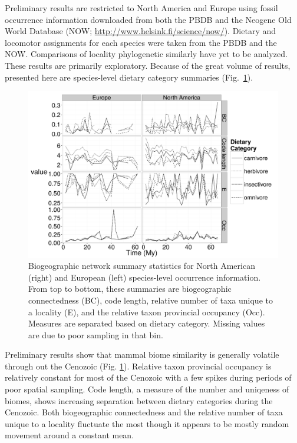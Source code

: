 \documentclass[11pt,letterpaper]{article}
\begin{document}
Preliminary results are restricted to North America and Europe using fossil occurrence information downloaded from both the PBDB and the Neogene Old World Database (NOW; \url{http://www.helsink.fi/science/now/}). Dietary and locomotor assignments for each species were taken from the PBDB and the NOW. Comparisons of locality phylogenetic similarly have yet to be analyzed. These results are primarily exploratory. Because of the great volume of results, presented here are species-level dietary category summaries (Fig.~\ref{fig:com}).

\begin{figure}[ht]
  \centering
  \includegraphics[width = \textwidth, height = 0.4\textheight, keepaspectratio = true]{figure/diets}
  \caption{Biogeographic network summary statistics for North American (right) and European (left) species-level occurrence information. From top to bottom, these summaries are biogeographic connectedness (BC), code length, relative number of taxa unique to a locality (E), and the relative taxon provincial occupancy (Occ). Measures are separated based on dietary category. Missing values are due to poor sampling in that bin.}
  \label{fig:com}
\end{figure}

Preliminary results show that mammal biome similarity is generally volatile through out the Cenozoic (Fig. \ref{fig:com}). Relative taxon provincial occupancy is relatively constant for most of the Cenozoic with a few spikes during periods of poor spatial sampling. Code length, a measure of the number and uniqeness of biomes, shows increasing separation between dietary categories during the Cenozoic. Both biogeographic connectedness and the relative number of taxa unique to a locality fluctuate the most though it appears to be mostly random movement around a constant mean.
\end{document}
